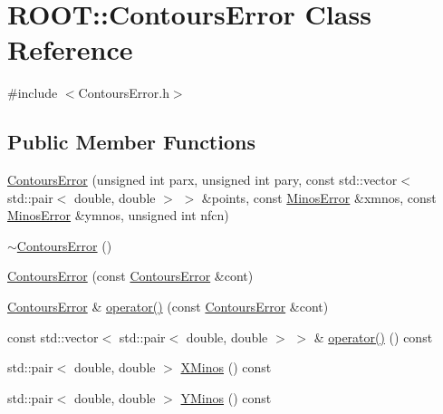 \hypertarget{classROOT_1_1Minuit2_1_1ContoursError}{}\section{R\+O\+OT\+:\+:Contours\+Error Class Reference}
\label{classROOT_1_1Minuit2_1_1ContoursError}


{\ttfamily \#include $<$Contours\+Error.\+h$>$}

\subsection*{Public Member Functions}
\begin{DoxyCompactItemize}
\item 
\mbox{\hyperlink{classROOT_1_1Minuit2_1_1ContoursError_abe494ac0098e41bf38fd4023e018e340}{Contours\+Error}} (unsigned int parx, unsigned int pary, const std\+::vector$<$ std\+::pair$<$ double, double $>$ $>$ \&points, const \mbox{\hyperlink{classROOT_1_1Minuit2_1_1MinosError}{Minos\+Error}} \&xmnos, const \mbox{\hyperlink{classROOT_1_1Minuit2_1_1MinosError}{Minos\+Error}} \&ymnos, unsigned int nfcn)
\item 
\mbox{\hyperlink{classROOT_1_1Minuit2_1_1ContoursError_a712a4699d5a022af68106524be05d862}{$\sim$\+Contours\+Error}} ()
\item 
\mbox{\hyperlink{classROOT_1_1Minuit2_1_1ContoursError_a270e1882e03ca939a8a910f9c6f3cbeb}{Contours\+Error}} (const \mbox{\hyperlink{classROOT_1_1Minuit2_1_1ContoursError}{Contours\+Error}} \&cont)
\item 
\mbox{\hyperlink{classROOT_1_1Minuit2_1_1ContoursError}{Contours\+Error}} \& \mbox{\hyperlink{classROOT_1_1Minuit2_1_1ContoursError_a17f1d0a4579d605cd25da8e0e27bf4ba}{operator()}} (const \mbox{\hyperlink{classROOT_1_1Minuit2_1_1ContoursError}{Contours\+Error}} \&cont)
\item 
const std\+::vector$<$ std\+::pair$<$ double, double $>$ $>$ \& \mbox{\hyperlink{classROOT_1_1Minuit2_1_1ContoursError_ad73e9dd73b1b7480342dd523e78a8def}{operator()}} () const
\item 
std\+::pair$<$ double, double $>$ \mbox{\hyperlink{classROOT_1_1Minuit2_1_1ContoursError_afd1906c6e1b9ddd74363df072590183f}{X\+Minos}} () const
\item 
std\+::pair$<$ double, double $>$ \mbox{\hyperlink{classROOT_1_1Minuit2_1_1ContoursError_a181d8326a32d95dd0f619bcb63076c00}{Y\+Minos}} () const

\end{DoxyCompactItemize}
